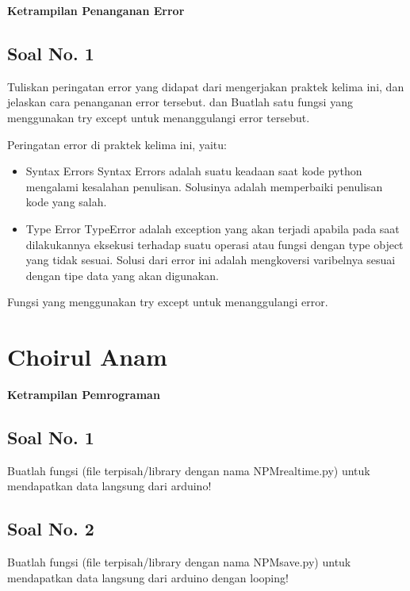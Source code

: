 \hfill \break
{\Large \textbf{Ketrampilan Penanganan Error}}

\subsection{Soal No. 1}
Tuliskan  peringatan  error  yang  didapat  dari  mengerjakan  praktek  kelima  ini, dan  jelaskan  cara  penanganan  error  tersebut.   dan  Buatlah  satu  fungsi  yang menggunakan try except untuk menanggulangi error tersebut.

\hfill \break
Peringatan error di praktek kelima ini, yaitu:
\begin{itemize}
	\item Syntax Errors
	Syntax Errors adalah suatu keadaan saat kode python mengalami kesalahan penulisan. Solusinya adalah memperbaiki penulisan kode yang salah.
		
	\item Type Error
	TypeError adalah exception yang akan terjadi apabila pada saat dilakukannya eksekusi terhadap suatu operasi atau fungsi dengan type object yang tidak sesuai. Solusi dari error ini adalah mengkoversi varibelnya sesuai dengan tipe data yang akan digunakan.
\end{itemize}

\hfill \break
Fungsi yang menggunakan try except untuk menanggulangi error.



\section{Choirul Anam}
{\Large \textbf{Ketrampilan Pemrograman}}
\subsection{Soal No. 1}
Buatlah  fungsi  (file  terpisah/library  dengan  nama  NPMrealtime.py)  untuk mendapatkan data langsung dari arduino!



\subsection{Soal No. 2}
Buatlah fungsi (file terpisah/library dengan nama NPMsave.py) untuk mendapatkan data langsung dari arduino dengan looping!


